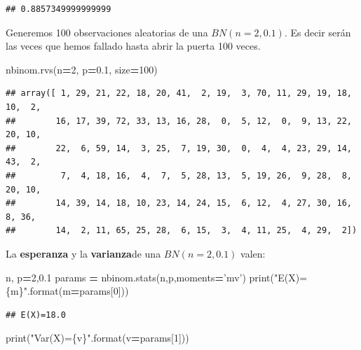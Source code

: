 \documentclass[]{book}
\newenvironment{Shaded}{\begin{snugshade}}{\end{snugshade}}
\newcommand{\BuiltInTok}[1]{#1}
\newcommand{\DecValTok}[1]{\textcolor[rgb]{0.00,0.00,0.81}{#1}}
\newcommand{\FloatTok}[1]{\textcolor[rgb]{0.00,0.00,0.81}{#1}}
\newcommand{\NormalTok}[1]{#1}
\newcommand{\OperatorTok}[1]{\textcolor[rgb]{0.81,0.36,0.00}{\textbf{#1}}}
\newcommand{\SpecialCharTok}[1]{\textcolor[rgb]{0.00,0.00,0.00}{#1}}
\newcommand{\StringTok}[1]{\textcolor[rgb]{0.31,0.60,0.02}{#1}}
\begin{document}
\begin{verbatim}
## 0.8857349999999999
\end{verbatim}

Generemos 100 observaciones aleatorias de una \(BN(n=2,0.1)\). Es decir serán las veces que hemos fallado hasta abrir la puerta 100 veces.

\begin{Shaded}
\begin{Highlighting}[]
\NormalTok{nbinom.rvs(n}\OperatorTok{=}\DecValTok{2}\NormalTok{, p}\OperatorTok{=}\FloatTok{0.1}\NormalTok{, size}\OperatorTok{=}\DecValTok{100}\NormalTok{)}
\end{Highlighting}
\end{Shaded}

\begin{verbatim}
## array([ 1, 29, 21, 22, 18, 20, 41,  2, 19,  3, 70, 11, 29, 19, 18, 10,  2,
##        16, 17, 39, 72, 33, 13, 16, 28,  0,  5, 12,  0,  9, 13, 22, 20, 10,
##        22,  6, 59, 14,  3, 25,  7, 19, 30,  0,  4,  4, 23, 29, 14, 43,  2,
##         7,  4, 18, 16,  4,  7,  5, 28, 13,  5, 19, 26,  9, 28,  8, 20, 10,
##        14, 39, 14, 18, 10, 23, 14, 24, 15,  6, 12,  4, 27, 30, 16,  8, 36,
##        14,  2, 11, 65, 25, 28,  6, 15,  3,  4, 11, 25,  4, 29,  2])
\end{verbatim}

La \textbf{esperanza} y la \textbf{varianza}de una \(BN(n=2,0.1)\) valen:

\begin{Shaded}
\begin{Highlighting}[]
\NormalTok{n, p}\OperatorTok{=}\DecValTok{2}\NormalTok{,}\FloatTok{0.1}
\NormalTok{params }\OperatorTok{=}\NormalTok{ nbinom.stats(n,p,moments}\OperatorTok{=}\StringTok{'mv'}\NormalTok{)}
\BuiltInTok{print}\NormalTok{(}\StringTok{"E(X)=}\SpecialCharTok{\{m\}}\StringTok{"}\NormalTok{.}\BuiltInTok{format}\NormalTok{(m}\OperatorTok{=}\NormalTok{params[}\DecValTok{0}\NormalTok{]))}
\end{Highlighting}
\end{Shaded}

\begin{verbatim}
## E(X)=18.0
\end{verbatim}

\begin{Shaded}
\begin{Highlighting}[]
\BuiltInTok{print}\NormalTok{(}\StringTok{"Var(X)=}\SpecialCharTok{\{v\}}\StringTok{"}\NormalTok{.}\BuiltInTok{format}\NormalTok{(v}\OperatorTok{=}\NormalTok{params[}\DecValTok{1}\NormalTok{]))}
\end{Highlighting}
\end{Shaded}
\end{document}
